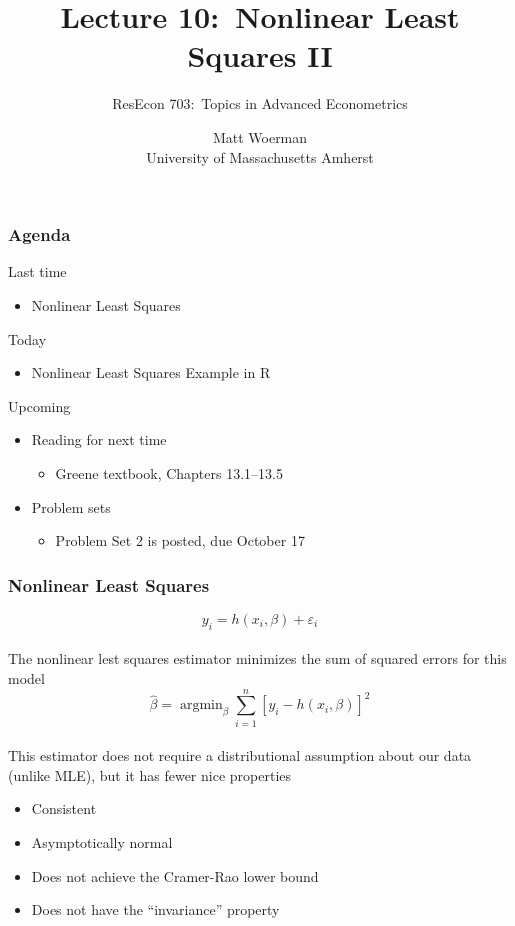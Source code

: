 \documentclass{beamer}
\title[Lecture 10:\ Nonlinear Least Squares II]{Lecture 10:\ Nonlinear Least Squares II}
\author[ResEcon 703:\ Advanced Econometrics]{ResEcon 703:\ Topics in Advanced Econometrics}
\date{Matt Woerman\\University of Massachusetts Amherst}
\DeclareMathOperator*{\argmin}{argmin}
\begin{document}
{ 
\begin{frame}[noframenumbering]
    \titlepage
\end{frame}
}

\begin{frame}\frametitle{Agenda}
    Last time
    \begin{itemize}
        \item Nonlinear Least Squares
    \end{itemize}
    \vspace{2ex}
    Today
    \begin{itemize}
        \item Nonlinear Least Squares Example in R
    \end{itemize}
    \vspace{2ex}
    Upcoming
    \begin{itemize}
        \item Reading for next time
        \begin{itemize}
            \item Greene textbook, Chapters 13.1--13.5
        \end{itemize}
        \item Problem sets
        \begin{itemize}
            \item Problem Set 2 is posted, due October 17
        \end{itemize}
    \end{itemize}
\end{frame}

\begin{frame}\frametitle{Nonlinear Least Squares}
    $$y_i = h(x_i, \beta) + \varepsilon_i$$ \\
    \vspace{2ex}
    The nonlinear lest squares estimator minimizes the sum of squared errors for this model
    $$\hat{\beta} = \argmin_{\beta} \sum_{i = 1}^n [y_i - h(x_i, \beta)]^2$$ \\
    \vspace{2ex}
    This estimator does not require a distributional assumption about our data (unlike MLE), but it has fewer nice properties
    \begin{itemize}
        \item Consistent
        \item Asymptotically normal
        \item Does not achieve the Cramer-Rao lower bound
        \item Does not have the ``invariance'' property
    \end{itemize}
\end{frame}
\end{document}
